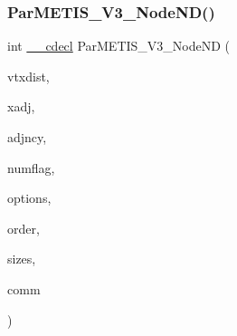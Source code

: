 \subsubsection{\texorpdfstring{Par\+M\+E\+T\+I\+S\+\_\+\+V3\+\_\+\+Node\+N\+D()}{ParMETIS\_V3\_NodeND()}}
{\footnotesize\ttfamily int \hyperlink{include_2parmetis_8h_a238347d7669f8f1e9c83bfe63a2730c4}{\+\_\+\+\_\+cdecl} Par\+M\+E\+T\+I\+S\+\_\+\+V3\+\_\+\+Node\+ND (\begin{DoxyParamCaption}\item[{\hyperlink{3rd_party_2parmetis-4_80_83_2metis_2include_2metis_8h_aaa5262be3e700770163401acb0150f52}{idx\+\_\+t} $\ast$}]{vtxdist,  }\item[{\hyperlink{3rd_party_2parmetis-4_80_83_2metis_2include_2metis_8h_aaa5262be3e700770163401acb0150f52}{idx\+\_\+t} $\ast$}]{xadj,  }\item[{\hyperlink{3rd_party_2parmetis-4_80_83_2metis_2include_2metis_8h_aaa5262be3e700770163401acb0150f52}{idx\+\_\+t} $\ast$}]{adjncy,  }\item[{\hyperlink{3rd_party_2parmetis-4_80_83_2metis_2include_2metis_8h_aaa5262be3e700770163401acb0150f52}{idx\+\_\+t} $\ast$}]{numflag,  }\item[{\hyperlink{3rd_party_2parmetis-4_80_83_2metis_2include_2metis_8h_aaa5262be3e700770163401acb0150f52}{idx\+\_\+t} $\ast$}]{options,  }\item[{\hyperlink{3rd_party_2parmetis-4_80_83_2metis_2include_2metis_8h_aaa5262be3e700770163401acb0150f52}{idx\+\_\+t} $\ast$}]{order,  }\item[{\hyperlink{3rd_party_2parmetis-4_80_83_2metis_2include_2metis_8h_aaa5262be3e700770163401acb0150f52}{idx\+\_\+t} $\ast$}]{sizes,  }\item[{M\+P\+I\+\_\+\+Comm $\ast$}]{comm }\end{DoxyParamCaption})}

